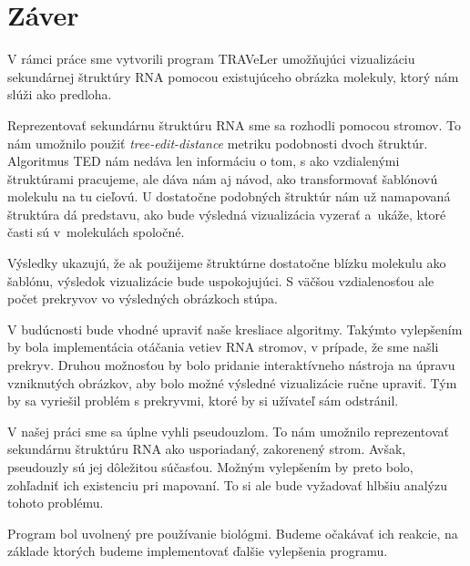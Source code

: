\chapter*{Záver}

V rámci práce sme vytvorili program TRAVeLer umožňujúci
vizualizáciu sekundárnej štruktúry RNA pomocou existujúceho
obrázka molekuly, ktorý nám slúži ako predloha.

Reprezentovať sekundárnu štruktúru RNA sme sa rozhodli pomocou
stromov. To nám umožnilo použiť \textit{tree-edit-distance}
metriku podobnosti dvoch štruktúr.
Algoritmus TED nám nedáva len informáciu o tom,
s ako vzdialenými štruktúrami pracujeme, ale dáva nám
aj návod, ako transformovať šablónovú molekulu na tu cieľovú.
U dostatočne podobných štruktúr nám už namapovaná štruktúra
dá predstavu, ako bude výsledná vizualizácia vyzerať
a~ukáže, ktoré časti sú v~molekulách spoločné.

Výsledky ukazujú, že ak použijeme štruktúrne dostatočne blízku
molekulu ako šablónu, výsledok vizualizácie bude uspokojujúci.
S väčšou vzdialenosťou ale počet prekryvov vo výsledných obrázkoch
stúpa.

V budúcnosti bude vhodné upraviť naše kresliace algoritmy.
Takýmto vylepšením by bola implementácia otáčania vetiev RNA stromov,
v prípade, že sme našli prekryv.
Druhou možnosťou by bolo pridanie interaktívneho nástroja na úpravu
vzniknutých obrázkov, aby bolo možné výsledné vizualizácie ručne upraviť.
Tým by sa vyriešil problém s prekryvmi, ktoré by si užívateľ sám odstránil.

V našej práci sme sa úplne vyhli pseudouzlom. To nám umožnilo
reprezentovať sekundárnu štruktúru RNA ako usporiadaný, zakorenený strom.
Avšak, pseudouzly sú jej dôležitou súčasťou.
Možným vylepšením by preto bolo, zohľadniť ich existenciu pri mapovaní.
To si ale bude vyžadovať hlbšiu analýzu tohoto problému.

Program bol uvolnený pre používanie biológmi. Budeme očakávať ich reakcie,
na základe ktorých budeme implementovať ďalšie vylepšenia programu.

